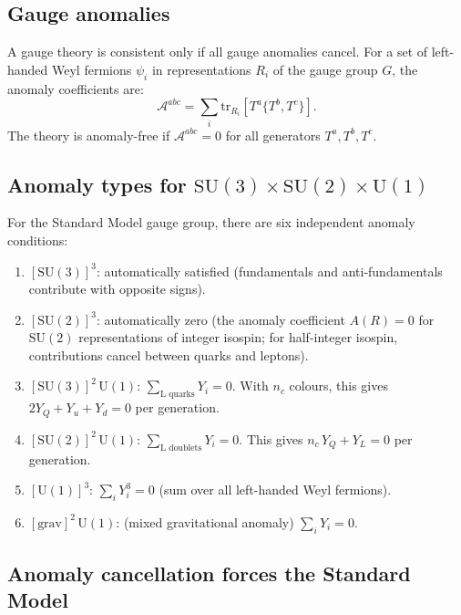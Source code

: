 \documentclass[12pt]{article}
\theoremstyle{definition}
\theoremstyle{remark}
\newcommand{\SU}{\mathrm{SU}}
\newcommand{\UU}{\mathrm{U}}
\newcommand{\tr}{\mathrm{tr}}
\begin{document}
\subsection{Gauge anomalies}

A gauge theory is consistent only if all gauge anomalies cancel.
For a set of left-handed Weyl fermions $\psi_i$ in representations
$R_i$ of the gauge group $G$, the anomaly coefficients are:
\begin{equation}\label{eq:anomaly}
  \mathcal{A}^{abc}
  = \sum_i \tr_{R_i}[T^a \{T^b, T^c\}].
\end{equation}
The theory is anomaly-free if $\mathcal{A}^{abc} = 0$ for all
generators $T^a, T^b, T^c$.

\subsection{Anomaly types for $\SU(3) \times \SU(2) \times \UU(1)$}

For the Standard Model gauge group, there are six independent
anomaly conditions:

\begin{enumerate}[label=(\roman*)]
\item $[\SU(3)]^3$: automatically satisfied (fundamentals and
  anti-fundamentals contribute with opposite signs).

\item $[\SU(2)]^3$: automatically zero (the anomaly coefficient
  $A(R) = 0$ for $\SU(2)$ representations of integer isospin;
  for half-integer isospin, contributions cancel between quarks
  and leptons).

\item $[\SU(3)]^2\,\UU(1)$:
  $\sum_{\text{L quarks}} Y_i = 0$.  With $n_c$ colours, this
  gives $2 Y_Q + Y_u + Y_d = 0$ per generation.

\item $[\SU(2)]^2\,\UU(1)$:
  $\sum_{\text{L doublets}} Y_i = 0$.  This gives
  $n_c\,Y_Q + Y_L = 0$ per generation.

\item $[\UU(1)]^3$:
  $\sum_i Y_i^3 = 0$ (sum over all left-handed Weyl fermions).

\item $[\text{grav}]^2\,\UU(1)$: (mixed gravitational anomaly)
  $\sum_i Y_i = 0$.
\end{enumerate}

\subsection{Anomaly cancellation forces the Standard Model}
\end{document}
